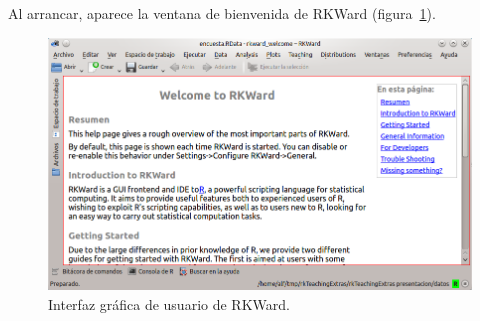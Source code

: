 Al arrancar, aparece la ventana de bienvenida de RKWard (figura~\ref{g:rkward}).
\begin{figure}[htp]
  \centering
  \includegraphics[scale=0.5]{capitulos/introduccion/img/rkward}
  \caption{Interfaz gráfica de usuario de RKWard.}
  \label{g:rkward}
\end{figure}

